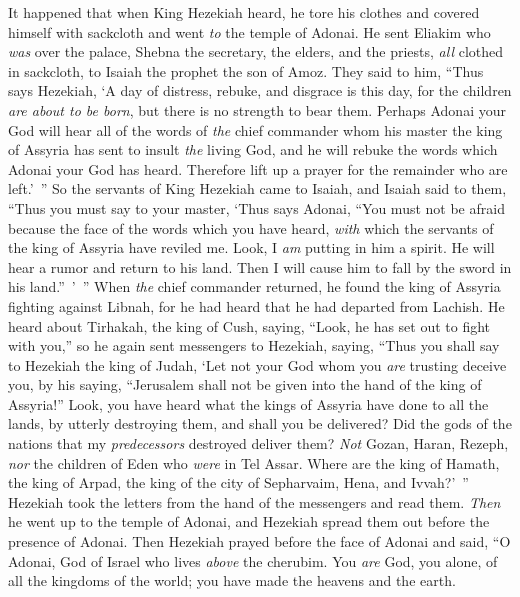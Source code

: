 \begin{biblechapter} %
 It happened that when King Hezekiah heard, he tore his clothes and covered himself with sackcloth and went \textit{to} the temple of Adonai.
\verse He sent Eliakim who \textit{was} over the palace, Shebna the secretary, the elders, and the priests, \textit{all} clothed in sackcloth, to Isaiah the prophet the son of Amoz.
\verse They said to him, “Thus says Hezekiah, ‘A day of distress, rebuke, and disgrace is this day, for the children \textit{are about to be born}, but there is no strength to bear them.
\verse Perhaps Adonai your God will hear all of the words of \textit{the} chief commander whom his master the king of Assyria has sent to insult \textit{the} living God, and he will rebuke the words which Adonai your God has heard. Therefore lift up a prayer for the remainder who are left.’ ”
\verse So the servants of King Hezekiah came to Isaiah,
\verse and Isaiah said to them, “Thus you must say to your master, ‘Thus says Adonai, “You must not be afraid because the face of the words which you have heard, \textit{with} which the servants of the king of Assyria have reviled me.
\verse Look, I \textit{am} putting in him a spirit. He will hear a rumor and return to his land. Then I will cause him to fall by the sword in his land.” ’ ”
 When \textit{the} chief commander returned, he found the king of Assyria fighting against Libnah, for he had heard that he had departed from Lachish.
\verse He heard about Tirhakah, the king of Cush, saying, “Look, he has set out to fight with you,” so he again sent messengers to Hezekiah, saying,
\verse “Thus you shall say to Hezekiah the king of Judah, ‘Let not your God whom you \textit{are} trusting deceive you, by his saying, “Jerusalem shall not be given into the hand of the king of Assyria!”
\verse Look, you have heard what the kings of Assyria have done to all the lands, by utterly destroying them, and shall you be delivered?
\verse Did the gods of the nations that my \textit{predecessors} destroyed deliver them? \textit{Not} Gozan, Haran, Rezeph, \textit{nor} the children of Eden who \textit{were} in Tel Assar.
\verse Where are the king of Hamath, the king of Arpad, the king of the city of Sepharvaim, Hena, and Ivvah?’ ”
 Hezekiah took the letters from the hand of the messengers and read them. \textit{Then} he went up to the temple of Adonai, and Hezekiah spread them out before the presence of Adonai.
\verse Then Hezekiah prayed before the face of Adonai and said, “O Adonai, God of Israel who lives \textit{above} the cherubim. You \textit{are} God, you alone, of all the kingdoms of the world; you have made the heavens and the earth.

\end{biblechapter}
